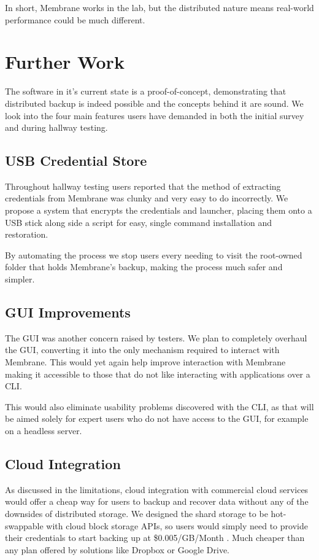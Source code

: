 \documentclass[11pt, a4paper, twoside]{report}
\begin{document}
In short, Membrane works in the lab, but the distributed nature means real-world performance could be much different.

\section{Further Work}

The software in it's current state is a proof-of-concept, demonstrating that distributed backup is indeed possible and the concepts behind it are sound. We look into the four main features users have demanded in both the initial survey and during hallway testing.

\subsection{USB Credential Store}

Throughout hallway testing users reported that the method of extracting credentials from Membrane was clunky and very easy to do incorrectly. We propose a system that encrypts the credentials and launcher, placing them onto a USB stick along side a script for easy, single command installation and restoration.

By automating the process we stop users every needing to visit the root-owned folder that holds Membrane's backup, making the process much safer and simpler.

\subsection{GUI Improvements}

The GUI was another concern raised by testers. We plan to completely overhaul the GUI, converting it into the only mechanism required to interact with Membrane. This would yet again help improve interaction with Membrane making it accessible to those that do not like interacting with applications over a CLI.

This would also eliminate usability problems discovered with the CLI, as that will be aimed solely for expert users who do not have access to the GUI, for example on a headless server.

\subsection{Cloud Integration}

As discussed in the limitations, cloud integration with commercial cloud services would offer a cheap way for users to backup and recover data without any of the downsides of distributed storage. We designed the shard storage to be hot-swappable with cloud block storage APIs, so users would simply need to provide their credentials to start backing up at \$0.005/GB/Month \citep{backblaze2017pricing}. Much cheaper than any plan offered by solutions like Dropbox or Google Drive.
\end{document}
